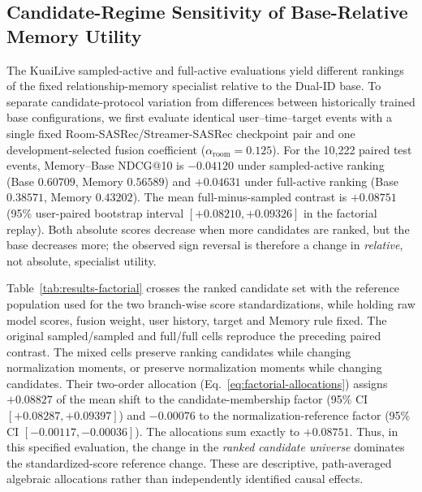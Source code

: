 
\subsection{Candidate-Regime Sensitivity of Base-Relative Memory Utility}
\label{sec:results-regimes}

The KuaiLive sampled-active and full-active evaluations yield different rankings of the fixed relationship-memory specialist relative to the Dual-ID base. To separate candidate-protocol variation from differences between historically trained base configurations, we first evaluate identical user--time--target events with a single fixed Room-SASRec/Streamer-SASRec checkpoint pair and one development-selected fusion coefficient ($\alpha_{\mathrm{room}}=0.125$). For the 10,222 paired test events, Memory--Base NDCG@10 is $-0.04120$ under sampled-active ranking (Base $0.60709$, Memory $0.56589$) and $+0.04631$ under full-active ranking (Base $0.38571$, Memory $0.43202$). The mean full-minus-sampled contrast is $+0.08751$ (95\% user-paired bootstrap interval $[+0.08210,+0.09326]$ in the factorial replay). Both absolute scores decrease when more candidates are ranked, but the base decreases more; the observed sign reversal is therefore a change in \emph{relative}, not absolute, specialist utility.

Table~\ref{tab:results-factorial} crosses the ranked candidate set with the reference population used for the two branch-wise score standardizations, while holding raw model scores, fusion weight, user history, target and Memory rule fixed. The original sampled/sampled and full/full cells reproduce the preceding paired contrast. The mixed cells preserve ranking candidates while changing normalization moments, or preserve normalization moments while changing candidates. Their two-order allocation (Eq.~\eqref{eq:factorial-allocations}) assigns $+0.08827$ of the mean shift to the candidate-membership factor (95\% CI $[+0.08287,+0.09397]$) and $-0.00076$ to the normalization-reference factor (95\% CI $[-0.00117,-0.00036]$). The allocations sum exactly to $+0.08751$. Thus, in this specified evaluation, the change in the \emph{ranked candidate universe} dominates the standardized-score reference change. These are descriptive, path-averaged algebraic allocations rather than independently identified causal effects.

